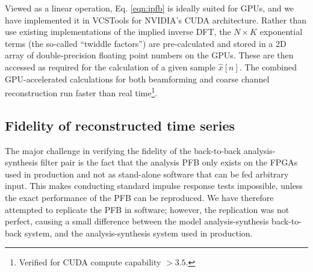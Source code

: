 \documentclass{pasa}%
\newcommand{\vcstools}{VCSTools}
\begin{document}
Viewed as a linear operation, Eq. \eqref{eqn:ipfb} is ideally suited for GPUs, and we have implemented it in \vcstools{} for NVIDIA's CUDA architecture.
Rather than use existing implementations of the implied inverse DFT, the $N \times K$ exponential terms (the so-called ``twiddle factors'') are pre-calculated and stored in a 2D array of double-precision floating point numbers on the GPUs.
These are then accessed as required for the calculation of a given sample $\hat{x}[n]$.
The combined GPU-accelerated calculations for both beamforming and coarse channel reconstruction run faster than real time\footnote{Verified for CUDA compute capability $>3.5$.}.

\subsection{Fidelity of reconstructed time series}
\label{sec:fidelity}

The major challenge in verifying the fidelity of the back-to-back analysis-synthesis filter pair is the fact that the analysis PFB only exists on the FPGAs used in production and not as stand-alone software that can be fed arbitrary input.
This makes conducting standard impulse response tests impossible, unless the exact performance of the PFB can be reproduced.
We have therefore attempted to replicate the PFB in software; however, the replication was not perfect, causing a small difference between the model analysis-synthesis back-to-back system, and the analysis-synthesis system used in production.
\end{document}
